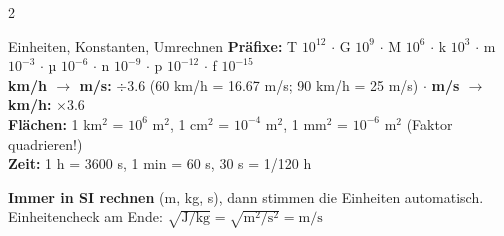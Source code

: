 \documentclass[10pt,a4paper]{article}
\begin{document}
\begin{multicols}{2}
\begin{gbox}{Einheiten, Konstanten, Umrechnen}
\textbf{Präfixe:} T $10^{12}$ $\cdot$ G $10^{9}$ $\cdot$ M $10^{6}$ $\cdot$ k $10^{3}$ $\cdot$ m $10^{-3}$ $\cdot$ µ $10^{-6}$ $\cdot$ n $10^{-9}$ $\cdot$ p $10^{-12}$ $\cdot$ f $10^{-15}$\\
\textbf{km/h $\to$ m/s:} $\div 3.6$ (60 km/h = 16.67 m/s; 90 km/h = 25 m/s) $\cdot$ \textbf{m/s $\to$ km/h:} $\times 3.6$\\
\textbf{Flächen:} 1 km$^2$ = $10^{6}$ m$^2$, 1 cm$^2$ = $10^{-4}$ m$^2$, 1 mm$^2$ = $10^{-6}$ m$^2$ (Faktor quadrieren!)\\
\textbf{Zeit:} 1 h = 3600 s, 1 min = 60 s, 30 s = 1/120 h

\vspace{2pt}
\textbf{Immer in SI rechnen} (m, kg, s), dann stimmen die Einheiten automatisch. Einheitencheck am Ende: $\sqrt{\mathrm{J/kg}} = \sqrt{\mathrm{m^2/s^2}} = \mathrm{m/s}$ \checkmark
\end{gbox}

\end{multicols}
\end{document}
